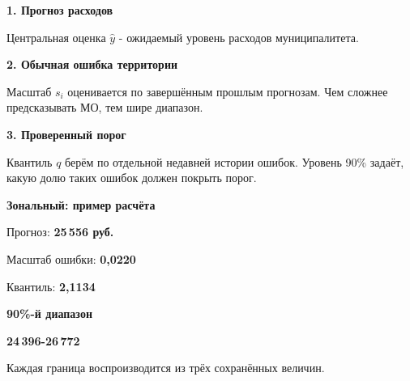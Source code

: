 \documentclass[12pt,a4paper,landscape]{article}
\newcommand{\Aside}[1]{\par{\fontsize{15}{19}\selectfont\bfseries\color{Green}#1\par}\vspace{2mm}}
\begin{document}
\begin{minipage}[t]{.53\linewidth}\par\vspace{0pt}\RaggedRight
\Aside{1. Прогноз расходов}
Центральная оценка $\widehat y$ - ожидаемый уровень расходов муниципалитета.
\par\vspace{6mm}\Aside{2. Обычная ошибка территории}
Масштаб $s_i$ оценивается по завершённым прошлым прогнозам. Чем сложнее предсказывать МО, тем шире диапазон.
\par\vspace{6mm}\Aside{3. Проверенный порог}
Квантиль $q$ берём по отдельной недавней истории ошибок. Уровень 90\% задаёт, какую долю таких ошибок должен покрыть порог.
\end{minipage}\hfill
\begin{minipage}[t]{.39\linewidth}\par\vspace{0pt}\RaggedRight
\Aside{Зональный: пример расчёта}
Прогноз: \textbf{25\,556 руб.}\par
Масштаб ошибки: \textbf{0,0220}\par
Квантиль: \textbf{2,1134}\par
\par\vspace{8mm}\Aside{90\%-й диапазон}
{\fontsize{27}{34}\selectfont\bfseries\color{Green}24\,396-26\,772}\par
\par\vspace{5mm}Каждая граница воспроизводится из трёх сохранённых величин.
\end{minipage}
\par{}\par
\end{document}

